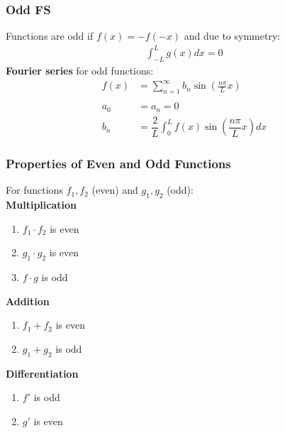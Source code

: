 \subsubsection{Odd FS}
Functions are odd if $f(x)=-f(-x)$ and due to symmetry:
\begin{align*}
    \int_{-L}^L g(x)dx=0
\end{align*}
\textbf{Fourier series} for odd functions:
\begin{align*}
    f(x) & =\sum_{n=1}^\infty b_n\sin\left(\frac{n\pi}Lx\right)          \\ \\
    a_0  & = a_n = 0                                                     \\
    b_n  & =\dfrac{2}{L}\int_0^L f(x)\sin\left(\dfrac{n\pi}{L}x\right)dx
\end{align*}

\subsubsection{Properties of Even and Odd Functions}
For functions $f_1, f_2$ (even) and $g_1, g_2$ (odd):\\
\textbf{Multiplication}
\begin{enumerate}
    \item $f_1\cdot f_2$ is even
    \item $g_1\cdot g_2$ is even
    \item $f\cdot g$ is odd
\end{enumerate}
\textbf{Addition}
\begin{enumerate}
    \item $f_1+f_2$ is even
    \item $g_1+g_2$ is odd
\end{enumerate}
\textbf{Differentiation}
\begin{enumerate}
    \item $f'$ is odd
    \item $g'$ is even
\end{enumerate}


